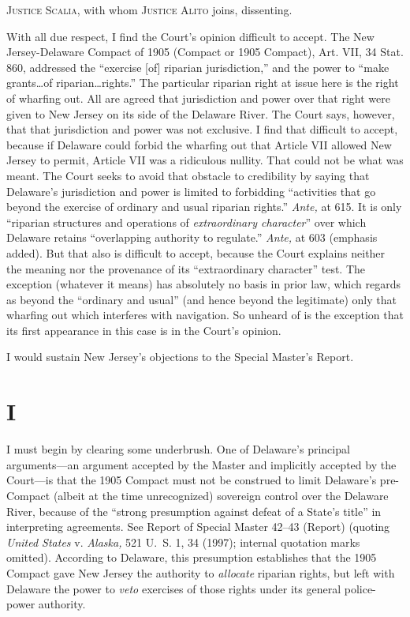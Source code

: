 
\setcounter{page}{628}

  \textsc{Justice Scalia,} with whom \textsc{Justice Alito} joins, dissenting.

  With all due respect, I find the Court's opinion difficult to
accept. The New Jersey-Delaware Compact of 1905 (Compact or 1905
Compact), Art. VII, 34 Stat. 860, addressed the ``exercise [of]
riparian jurisdiction,'' and the power to ``make grants\dots of
riparian\dots rights.'' The particular riparian right at issue here
is the right of wharfing out. All are agreed that jurisdiction and power
over that right were given to New Jersey on its side of the Delaware
River. The Court says, however, that that jurisdiction and power was
not exclusive. I find that difficult to accept, because if Delaware
could forbid the wharfing out that Article VII allowed New Jersey to
permit, Article VII was a ridiculous nullity. That could not be what
was meant. The Court seeks to avoid that obstacle to credibility by
saying that Delaware's jurisdiction and power is limited to forbidding
``activities that go beyond the exercise of ordinary and usual riparian
rights.'' \emph{Ante,} at 615. It is only ``riparian structures and
operations of \emph{extraordinary character}'' over which Delaware retains
``overlapping authority to regulate.'' \emph{Ante,} at 603 (emphasis
added). But that also is difficult to accept, because the Court
explains neither the meaning nor the provenance of its ``extraordinary
character'' test. The exception (whatever it means) has absolutely
no basis in prior law, which regards as beyond the ``ordinary and
usual'' (and hence beyond the legitimate) only that wharfing out which
interferes with navigation. So unheard of is the exception that its
first appearance in this case is in the Court's opinion.

  I would sustain New Jersey's objections to the Special Master's
Report. \newpage 

\section{I}

  I must begin by clearing some underbrush. One of Delaware's
principal arguments---an argument accepted by the Master and implicitly
accepted by the Court---is that the 1905 Compact must not be construed
to limit Delaware's pre-Compact (albeit at the time unrecognized)
sovereign control over the Delaware River, because of the ``strong
presumption against defeat of a State's title'' in interpreting
agreements. See Report of Special Master 42--43 (Report) (quoting
\emph{United States} v. \emph{Alaska,} 521 U.~S. 1, 34 (1997); internal
quotation marks omitted). According to Delaware, this presumption
establishes that the 1905 Compact gave New Jersey the authority to
\emph{allocate} riparian rights, but left with Delaware the power to
\emph{veto} exercises of those rights under its general police-power
authority.

